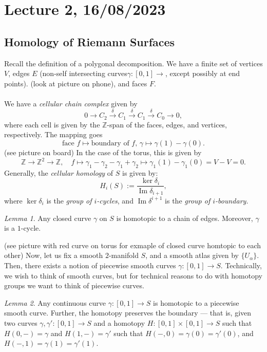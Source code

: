 \documentclass[a4paper]{report}
\theoremstyle{definition}
\theoremstyle{remark}
\theoremstyle{proposition}
\theoremstyle{conjecture}
\theoremstyle{lemma}
\newtheorem{lemma}{Lemma}
\theoremstyle{corollary}
\theoremstyle{exercise}
\theoremstyle{example}
\newcommand{\on}{\operatorname}
\begin{document}
\section{Lecture 2, 16/08/2023}

\subsection{Homology of Riemann Surfaces}

Recall the definition of a polygonal decomposition. 
We have a finite set of vertices $V$, edges $E$ (non-self intersecting curves$\gamma : [0,1]\to $, except possibly at end points).
(look at picture on phone), and faces $F$.\\\\
We have a \emph{cellular chain complex} given by 
$$0\longrightarrow C_2 \stackrel{\delta}{\longrightarrow} C_1 \stackrel{\delta}{\longrightarrow} C_1 \stackrel{\delta}{\longrightarrow} C_0 \longrightarrow0,$$
where each cell is given by the $\mathbb{Z}$-span of the faces, edges, and 
vertices, respectively. 
The mapping goes $$\text{face $f$} \longmapsto \text{boundary of $f$, $\gamma$} \longmapsto \gamma(1) - \gamma(0).$$
(see picture on board)
In the case of the torus, this is given by 
$$\mathbb{Z} \longrightarrow \mathbb{Z}^2 \longrightarrow \mathbb{Z}, \quad f\longmapsto \gamma_1-\gamma_2-\gamma_1+\gamma_2 \longmapsto \gamma_1(1)-\gamma_1(0) = V- V = 0.$$
Generally, the \emph{cellular homology} of $S$ is given by:
$$H_i(S) := \frac{\ker \delta_i}{\on{Im}\delta_{i+1}},$$
where $\ker\delta_i$ is the \emph{group of $i$-cycles}, and $\on{Im}\delta^{i+1}$ is the \emph{group of $i$-boundary.}

\begin{lemma}
    Any closed curve $\gamma$ on $S$ is homotopic to a chain of edges.
    Moreover, $\gamma$ is a $1$-cycle.
\end{lemma}

(see picture with red curve on torus for exmaple of closed curve homtopic to
each other)
Now, let us fix a smooth $2$-manifold $S$, and a smooth atlas given by 
$\lbrace U_\alpha\rbrace$. Then, there exists a notion of piecewise smooth
curves $\gamma : [0,1]\to S$. Technically, we wish to think of smooth curves,
but for technical reasons to do with homotopy groups we want to think of 
piecewise curves.

\begin{lemma}
    Any continuous curve $\gamma : [0,1]\to S$ is homotopic to a piecewise
    smooth curve. Further, the homotopy preserves the boundary --- that is,
    given two curves $\gamma, \gamma' : [0,1]\to S$ and a homotopy
    $H :[0,1]\times [0,1] \to S$ such that 
    $H(0,-) = \gamma$ and $H(1,-)=\gamma'$ such that $H(-,0) = \gamma(0)=\gamma'(0)$, and $H(-,1)=\gamma(1)=\gamma'(1)$.
\end{lemma}
\end{document}
